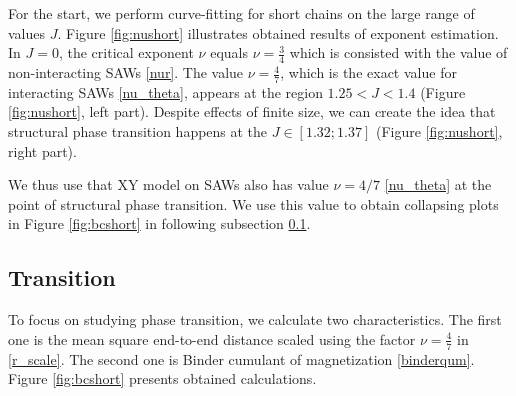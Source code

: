 For the start, we perform curve-fitting for short chains on the large range of values $J$. Figure \ref{fig:nushort} illustrates obtained results of exponent estimation. In $J=0$, the critical exponent $\nu$ equals $\nu = \frac{3}{4}$  which is consisted with the value of non-interacting SAWs \eqref{nur}. The value $\nu=\frac{4}{7}$, which is the exact value
for interacting SAWs \eqref{nu_theta}, appears at the region $ 1.25 < J < 1.4$ (Figure \ref{fig:nushort}, left part). Despite effects of finite size, we can create the idea that structural phase transition happens at the $J \in [1.32; 1.37]$ (Figure \ref{fig:nushort}, right part).  %

  We thus use that XY model on SAWs also has value $\nu = 4/7$ \eqref{nu_theta} at the point of structural phase transition. We use this value to obtain collapsing plots in Figure \ref{fig:bcshort} in following subsection \ref{section:Transition}. 

\subsection{Transition} \label{section:Transition}
To focus on studying phase transition, we calculate two characteristics. The first one is the mean square end-to-end distance scaled using the factor $\nu = \frac{4}{7}$ in \eqref{r_scale}. The second one is Binder cumulant of magnetization \eqref{binderqum}. Figure \ref{fig:bcshort}  presents obtained calculations. 

